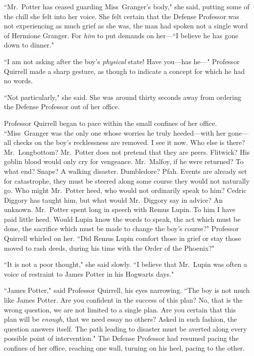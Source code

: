 ``Mr.~Potter has ceased guarding Miss~Granger's body," she said, putting some of the chill she felt into her voice. She felt certain that the Defense Professor was not experiencing as much grief as she was, the man had spoken not a single word of Hermione Granger. For \emph{him} to put demands on her---``I believe he has gone down to dinner."

``I am not asking after the boy's \emph{physical} state! Have you---has he---" Professor Quirrell made a sharp gesture, as though to indicate a concept for which he had no words.

``Not particularly," she said. She was around thirty seconds away from ordering the Defense Professor out of her office.

Professor Quirrell began to pace within the small confines of her office. ``Miss~Granger was the only one whose worries he truly heeded---with her gone---all checks on the boy's recklessness are removed. I see it now. Who else is there? Mr.~Longbottom? Mr.~Potter does not pretend that they are peers. Flitwick? His goblin blood would only cry for vengeance. Mr.~Malfoy, if he were returned? To what end? Snape? A walking disaster. Dumbledore? Pfah. Events are already set for catastrophe, they must be steered along some course they would not naturally go. Who might Mr.~Potter heed, who would not ordinarily speak to him? Cedric Diggory has taught him, but what would Mr.~Diggory say in advice? An unknown. Mr.~Potter spent long in speech with Remus Lupin. To him I have paid little heed. Would Lupin know the words to speak, the act which must be done, the sacrifice which must be made to change the boy's course?" Professor Quirrell whirled on her. ``Did Remus Lupin comfort those in grief or stay those moved to rash deeds, during his time with the Order of the Phoenix?"

``It is not a poor thought," she said slowly. ``I believe that Mr.~Lupin was often a voice of restraint to James Potter in his Hogwarts days."

``James Potter," said Professor Quirrell, his eyes narrowing. ``The boy is not much like James Potter. Are you confident in the success of this plan? No, that is the wrong question, we are not limited to a single plan. Are you certain that this plan will be \emph{enough}, that we need essay no others? Asked in such fashion, the question answers itself. The path leading to disaster must be averted along every possible point of intervention." The Defense Professor had resumed pacing the confines of her office, reaching one wall, turning on his heel, pacing to the other.

